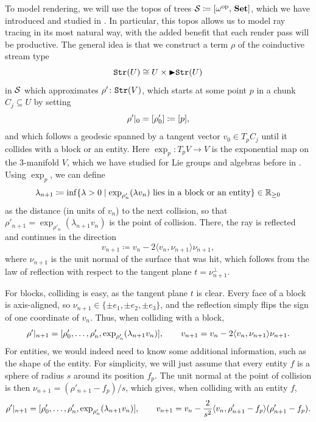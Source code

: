 To model rendering, we will use the topos of trees
$\mathcal{S} \coloneqq [\omega^{\mathrm{op}},\, \mathbf{Set}]$, which we
have introduced and studied in \cite{happelToposTrees2026}. In particular,
this topos allows us to model ray tracing in its most natural way, with the
added benefit that each render pass will be productive.
The general idea is that we construct a term $\rho$ of the coinductive stream
type
\[
	\texttt{Str}(U) \cong U \times \mathord{\blacktriangleright} \texttt{Str}(U)
\]
in $\mathcal{S}$ which approximates $\rho' \colon \texttt{Str}(V)$, which starts at
some point $p$ in a chunk $C_j \subseteq U$
by setting
\[
	\rho'|_{0} = [\rho'_0] \coloneqq [p],
\]
and which follows a geodesic spanned by a tangent vector $v_0 \in T_p C_j$
until it collides with a block or an entity. Here
$\exp_p \colon T_p V \to V$ is the exponential map on the $3$-manifold $V$,
which we have studied for Lie groups and algebras before in
\cite{happelExponentialMapLie2026}. Using $\exp_p$, we can define
\begin{equation}\label{eq:collision-distance}
	\lambda_{n+1} \coloneqq \inf \{\lambda > 0 \mid \exp_{\rho'_n}(\lambda v_n)
	\text{ lies in a block or an entity}\} \in \mathbb{R}_{\ge 0}
\end{equation}
as the distance (in units of $v_n$) to the next collision, so that
$\rho'_{n+1} = \exp_{\rho'_n}(\lambda_{n+1} v_n)$ is the point of collision.
There, the ray is reflected and continues in the direction
\[
	v_{n+1} \coloneqq v_n - 2 \langle v_n, \nu_{n+1} \rangle \nu_{n+1},
\]
where $\nu_{n+1}$ is the unit normal of the surface that was hit, which follows
from the law of reflection with respect to the tangent plane
$t = \nu_{n+1}^{\perp}$.

For blocks, colliding is easy, as the tangent plane $t$ is clear. Every face
of a block is axis-aligned, so $\nu_{n+1} \in \{\pm e_1, \pm e_2, \pm e_3\}$, and
the reflection simply flips the sign of one coordinate of $v_n$. Thus, when
colliding with a block,
\[
	\rho'|_{n+1} = [\rho'_0, \dots, \rho'_n, \exp_{\rho'_n}(\lambda_{n+1} v_n)],
	\qquad
	v_{n+1} = v_n - 2 \langle v_n, \nu_{n+1} \rangle \nu_{n+1}.
\]
For entities, we would indeed need to know some additional information, such as
the shape of the entity. For simplicity, we will just assume that every entity
$f$ is a sphere of radius $s$ around its position $f_p$. The unit normal at the
point of collision is then $\nu_{n+1} = (\rho'_{n+1} - f_p) / s$, which gives,
when colliding with an entity $f$,
\[
	\rho'|_{n+1} = [\rho'_0, \dots, \rho'_n, \exp_{\rho'_n}(\lambda_{n+1} v_n)],
	\qquad
	v_{n+1} = v_n - \frac{2}{s^2} \langle v_n, \rho'_{n+1} - f_p \rangle (\rho'_{n+1} - f_p).
\]

